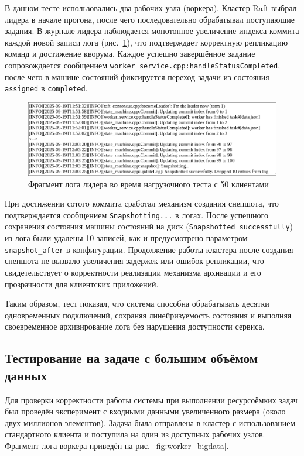 В данном тесте использовались два рабочих узла (воркера). Кластер Raft выбрал
лидера в начале прогона, после чего последовательно обрабатывал поступающие
задания. В журнале лидера наблюдается монотонное увеличение индекса коммита
каждой новой записи лога (рис.~\ref{fig:leader_log_50}), что подтверждает
корректную репликацию команд и достижение кворума. Каждое успешно завершённое
задание сопровождается сообщением
\texttt{worker\_service.cpp:handleStatusCompleted}, после чего в машине
состояний фиксируется переход задачи из состояния \texttt{assigned} в
\texttt{completed}.

\begin{figure}[h!]
    \centering
    \includegraphics[width=0.95\linewidth]{inc/leader-multi-conn.png}
    \caption{Фрагмент лога лидера во время нагрузочного теста с 50 клиентами}
    \label{fig:leader_log_50}
\end{figure}

При достижении сотого коммита сработал механизм создания снепшота, что
подтверждается сообщением \texttt{Snapshotting...} в логах. После успешного
сохранения состояния машины состояний на диск (\texttt{Snapshotted
successfully}) из лога были удалены 10 записей, как и предусмотрено параметром
\texttt{snapshot\_after} в конфигурации. Продолжение работы кластера после
создания снепшота не вызвало увеличения задержек или ошибок репликации, что
свидетельствует о корректности реализации механизма архивации и его
прозрачности для клиентских приложений.

Таким образом, тест показал, что система способна обрабатывать десятки
одновременных подключений, сохраняя линейризуемость состояния и выполняя
своевременное архивирование лога без нарушения доступности сервиса.

\subsection{Тестирование на задаче с большим объёмом данных}

Для проверки корректности работы системы при выполнении ресурсоёмких задач был
проведён эксперимент с входными данными увеличенного размера (около двух
миллионов элементов). Задача была отправлена в кластер с использованием
стандартного клиента и поступила на один из доступных рабочих узлов. Фрагмент
лога воркера приведён на рис.~\ref{fig:worker_bigdata}.

